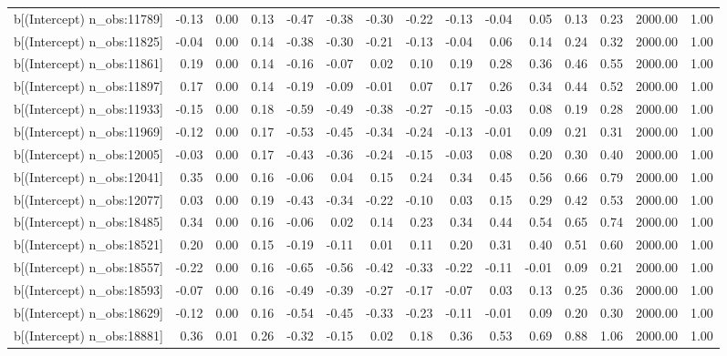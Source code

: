 \begin{table}[ht]
\begin{tabular}{rrrrrrrrrrrrrrr}
  b[(Intercept) n\_obs:11789] & -0.13 & 0.00 & 0.13 & -0.47 & -0.38 & -0.30 & -0.22 & -0.13 & -0.04 & 0.05 & 0.13 & 0.23 & 2000.00 & 1.00 \\ 
  b[(Intercept) n\_obs:11825] & -0.04 & 0.00 & 0.14 & -0.38 & -0.30 & -0.21 & -0.13 & -0.04 & 0.06 & 0.14 & 0.24 & 0.32 & 2000.00 & 1.00 \\ 
  b[(Intercept) n\_obs:11861] & 0.19 & 0.00 & 0.14 & -0.16 & -0.07 & 0.02 & 0.10 & 0.19 & 0.28 & 0.36 & 0.46 & 0.55 & 2000.00 & 1.00 \\ 
  b[(Intercept) n\_obs:11897] & 0.17 & 0.00 & 0.14 & -0.19 & -0.09 & -0.01 & 0.07 & 0.17 & 0.26 & 0.34 & 0.44 & 0.52 & 2000.00 & 1.00 \\ 
  b[(Intercept) n\_obs:11933] & -0.15 & 0.00 & 0.18 & -0.59 & -0.49 & -0.38 & -0.27 & -0.15 & -0.03 & 0.08 & 0.19 & 0.28 & 2000.00 & 1.00 \\ 
  b[(Intercept) n\_obs:11969] & -0.12 & 0.00 & 0.17 & -0.53 & -0.45 & -0.34 & -0.24 & -0.13 & -0.01 & 0.09 & 0.21 & 0.31 & 2000.00 & 1.00 \\ 
  b[(Intercept) n\_obs:12005] & -0.03 & 0.00 & 0.17 & -0.43 & -0.36 & -0.24 & -0.15 & -0.03 & 0.08 & 0.20 & 0.30 & 0.40 & 2000.00 & 1.00 \\ 
  b[(Intercept) n\_obs:12041] & 0.35 & 0.00 & 0.16 & -0.06 & 0.04 & 0.15 & 0.24 & 0.34 & 0.45 & 0.56 & 0.66 & 0.79 & 2000.00 & 1.00 \\ 
  b[(Intercept) n\_obs:12077] & 0.03 & 0.00 & 0.19 & -0.43 & -0.34 & -0.22 & -0.10 & 0.03 & 0.15 & 0.29 & 0.42 & 0.53 & 2000.00 & 1.00 \\ 
  b[(Intercept) n\_obs:18485] & 0.34 & 0.00 & 0.16 & -0.06 & 0.02 & 0.14 & 0.23 & 0.34 & 0.44 & 0.54 & 0.65 & 0.74 & 2000.00 & 1.00 \\ 
  b[(Intercept) n\_obs:18521] & 0.20 & 0.00 & 0.15 & -0.19 & -0.11 & 0.01 & 0.11 & 0.20 & 0.31 & 0.40 & 0.51 & 0.60 & 2000.00 & 1.00 \\ 
  b[(Intercept) n\_obs:18557] & -0.22 & 0.00 & 0.16 & -0.65 & -0.56 & -0.42 & -0.33 & -0.22 & -0.11 & -0.01 & 0.09 & 0.21 & 2000.00 & 1.00 \\ 
  b[(Intercept) n\_obs:18593] & -0.07 & 0.00 & 0.16 & -0.49 & -0.39 & -0.27 & -0.17 & -0.07 & 0.03 & 0.13 & 0.25 & 0.36 & 2000.00 & 1.00 \\ 
  b[(Intercept) n\_obs:18629] & -0.12 & 0.00 & 0.16 & -0.54 & -0.45 & -0.33 & -0.23 & -0.11 & -0.01 & 0.09 & 0.20 & 0.30 & 2000.00 & 1.00 \\ 
  b[(Intercept) n\_obs:18881] & 0.36 & 0.01 & 0.26 & -0.32 & -0.15 & 0.02 & 0.18 & 0.36 & 0.53 & 0.69 & 0.88 & 1.06 & 2000.00 & 1.00 \\ 

\end{tabular}
\end{table}
